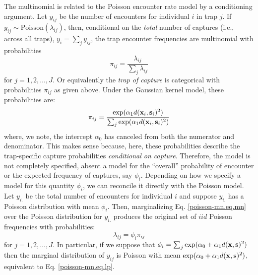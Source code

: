 The multinomial is related to the Poisson encounter rate
model by a conditioning argument. Let $y_{ij}$ be the number of
encounters for individual $i$ in trap $j$. If $y_{ij} \sim
\mbox{Poisson}(\lambda_{ij})$,
then,
conditional on the {\it total}
number of captures (i.e., across all traps), $y_{i} = \sum_{j}
y_{ij}$, the trap encounter frequencies are multinomial with
probabilities
\[
 \pi_{ij} =  \frac{ \lambda_{ij} } { \sum_{j} \lambda_{ij} }
\]
for $j=1,2,\ldots,J$.
Or equivalently the {\it trap of
  capture} is categorical with probabilities $\pi_{ij}$ as given above.
Under the Gaussian kernel model, these probabilities are:
\begin{equation}
\pi_{ij} =  \frac{ \exp(  \alpha_{1}  d({\bf x}_{i},{\bf s}_{i})^2 ) }  {
   \sum_{j} \exp( \alpha_{1} d({\bf x}_{i},{\bf s}_{i})^2)}
\label{poisson-mn.eq.mnprobs}
\end{equation}
where, we note, the intercept $\alpha_{0}$ has canceled from both the
numerator and denominator. This makes sense because, here, these
probabilities describe the trap-specific capture probabilities {\it
  conditional on capture}.  Therefore, the model is not completely
specified, absent a model for the ``overall'' probability of encounter
or the expected frequency of captures, say $\phi_{i}$. Depending on
how we specify a model for this quantity $\phi_{i}$, we can reconcile
it directly with the Poisson model.
Let $y_{i.}$ be the total number of encounters for individual $i$ and
suppose $y_{i.}$ has a Poisson distribution with mean $\phi_{i}$.
Then, marginalizing Eq. \ref{poisson-mn.eq.mn} over the Poisson
distribution for $y_{i.}$ produces the original set of $iid$ Poisson
frequencies with probabilities:
\[
 \lambda_{ij} = \phi_{i} \pi_{ij}
\]
for $j=1,2,\ldots,J$.
In particular, if we suppose that
$\phi_{i} = \sum_{j} \exp(\alpha_{0} + \alpha_{1} d({\bf x},{\bf s})^2)$
then the marginal distribution of $y_{ij}$ is Poisson with mean $\exp(
\alpha_{0} + \alpha_{1} d({\bf x},{\bf s})^2 )$, equivalent to
Eq. \ref{poisson-mn.eq.lp}.

